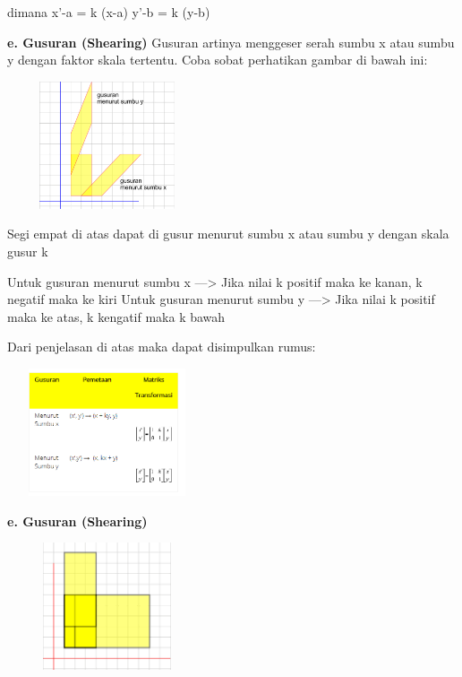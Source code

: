 \documentclass[11pt,fleqn]{book} %
\begin{document}
\noindent
\noindent dimana
\noindent x’-a = k (x-a)
\noindent y’-b = k (y-b)

\noindent \textbf{e. Gusuran (Shearing)}
\noindent Gusuran artinya menggeser serah sumbu x atau sumbu y dengan faktor skala tertentu. Coba sobat perhatikan gambar di bawah ini:

\noindent
\begin{center}
	\noindent \includegraphics*[width=2.32in, height=1.48in, keepaspectratio=false, trim=0.00in 0.11in 0.00in 0.00in]{Pictures/14.PNG}
\end{center}
\noindent 
Segi empat di atas dapat di gusur menurut sumbu x atau sumbu y dengan skala gusur k

\noindent
\noindent Untuk gusuran menurut sumbu x —> Jika nilai k positif maka ke kanan, k negatif maka ke kiri
\noindent Untuk gusuran menurut sumbu y —> Jika nilai k positif maka ke atas, k kengatif maka k bawah

\noindent
Dari penjelasan di atas maka dapat disimpulkan rumus:
\noindent
\begin{center}
	\noindent \includegraphics*[width=2.32in, height=1.48in, keepaspectratio=false, trim=0.00in 0.11in 0.00in 0.00in]{Pictures/15.PNG}
\end{center}

\noindent \textbf{e. Gusuran (Shearing)}
\noindent
\begin{center}
	\noindent \includegraphics*[width=2.32in, height=1.48in, keepaspectratio=false, trim=0.00in 0.11in 0.00in 0.00in]{Pictures/16.PNG}
\end{center}
\end{document}
